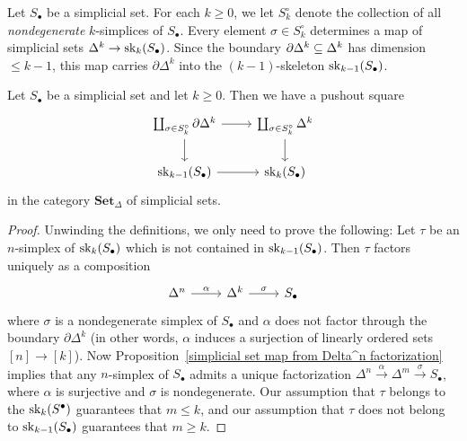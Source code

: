 Let $S_\bullet$ be a simplicial set. For each $k\geq 0$, we let $S_k^{\circ}$ denote the collection of all \textit{nondegenerate} $k$-simplices of $S_\bullet$. Every element $\sigma\in S_k^{\circ}$ determines a map of simplicial sets $\Delta^k\to\mathrm{sk}_k(S_\bullet)$. Since the boundary $\partial\Delta^k\subseteq\Delta^k$ has dimension $\leq k-1$, this map carries $\partial\Delta^k$ into the $(k-1)$-skeleton $\mathrm{sk}_{k-1}(S_\bullet)$.
\begin{proposition}\label{simplicial set pushout square}
Let $S_\bullet$ be a simplicial set and let $k\geq 0$. Then we have a pushout square
\[\begin{tikzcd}
\coprod_{\sigma\in S_k^{\circ}}\partial\Delta^k\ar[r]\ar[d]&\coprod_{\sigma\in S_k^{\circ}}\Delta^k\ar[d]\\
\sk_{k-1}(S_\bullet)\ar[r]&\sk_k(S_\bullet)
\end{tikzcd}\]
in the category $\mathbf{Set}_\Delta$ of simplicial sets.
\end{proposition}
\begin{proof}
Unwinding the definitions, we only need to prove the following: Let $\tau$ be an $n$-simplex of $\mathrm{sk}_k(S_\bullet)$ which is not contained in $\mathrm{sk}_{k-1}(S_\bullet)$. Then $\tau$ factors uniquely as a composition
\[\begin{tikzcd}
\Delta^n\ar[r,"\alpha"]&\Delta^k\ar[r,"\sigma"]&S_\bullet
\end{tikzcd}\]
where $\sigma$ is a nondegenerate simplex of $S_\bullet$ and $\alpha$ does not factor through the boundary $\partial\Delta^k$ (in other words, $\alpha$ induces a surjection of linearly ordered sets $[n]\to[k]$). Now Proposition~\ref{simplicial set map from Delta^n factorization} implies that any $n$-simplex of $S_\bullet$ admits a unique factorization $\Delta^n\stackrel{\alpha}{\to}\Delta^m\stackrel{\sigma}{\to}S_\bullet$, where $\alpha$ is surjective and $\sigma$ is nondegenerate. Our assumption that $\tau$ belongs to the $\mathrm{sk}_k(S^\bullet)$ guarantees that $m\leq k$, and our assumption that $\tau$ does not belong to $\mathrm{sk}_{k-1}(S_\bullet)$ guarantees that $m\geq k$.
\end{proof}
